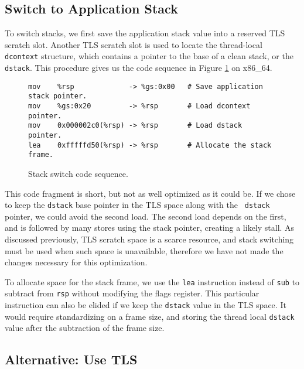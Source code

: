 
\subsection{Switch to Application Stack}

To switch stacks, we first save the application stack value into a reserved TLS
scratch slot.  Another TLS scratch slot is used to locate the thread-local {\tt
dcontext} structure, which contains a pointer to the base of a clean stack, or
the {\tt dstack}.  This procedure gives us the code sequence in Figure
\ref{fig:stack_switch} on x86\_64.

\begin{figure}
\begin{verbatim}
mov    %rsp             -> %gs:0x00   # Save application stack pointer.
mov    %gs:0x20         -> %rsp       # Load dcontext pointer.
mov    0x000002c0(%rsp) -> %rsp       # Load dstack pointer.
lea    0xfffffd50(%rsp) -> %rsp       # Allocate the stack frame.
\end{verbatim}
\caption{Stack switch code sequence.}
\label{fig:stack_switch}
\end{figure}

This code fragment is short, but not as well optimized as it could be.  If we
chose to keep the {\tt dstack} base pointer in the TLS space along with the {\tt
dstack} pointer, we could avoid the second load.  The second load depends on the
first, and is followed by many stores using the stack pointer, creating a likely
stall.  As discussed previously, TLS scratch space is a scarce resource, and
stack switching must be used when such space is unavailable, therefore we have
not made the changes necessary for this optimization.

To allocate space for the stack frame, we use the {\tt lea} instruction instead
of {\tt sub} to subtract from {\tt rsp} without modifying the flags register.
This particular instruction can also be elided if we keep the {\tt dstack} value
in the TLS space.  It would require standardizing on a frame size, and storing
the thread local {\tt dstack} value after the subtraction of the frame size.

\subsection{Alternative: Use TLS}
\label{sec:tls_scratch}

